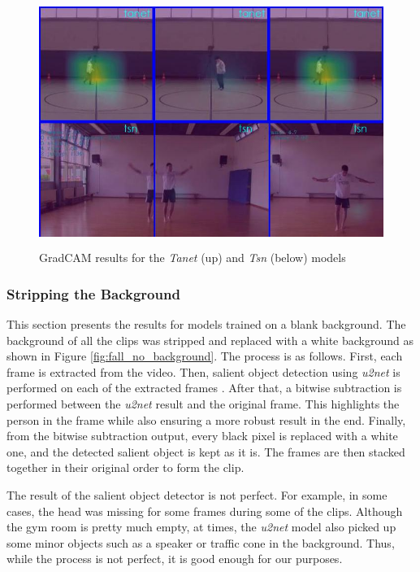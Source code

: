 \documentclass[extern,palatino]{cgMA}
\begin{document}
\begin{figure}[h]
\center
\includegraphics[height={230pt}, width={370pt}]{Thesis/images/gradcam-2D.jpg}
\caption{GradCAM results for the \textit{Tanet} (up) and \textit{Tsn} (below) models}
\label{fig:gradcam_2d}
\end{figure}

\subsubsection{Stripping the Background}
\label{research_question_5_3}

This section presents the results for models trained on a blank background. The background of all the clips was stripped and replaced with a white background as shown in Figure \ref{fig:fall_no_background}. The process is as follows. First, each frame is extracted from the video. Then, salient object detection using \textit{u2net} is performed on each of the extracted frames \cite{qin2020u2}. After that, a bitwise subtraction is performed between the \textit{u2net} result and the original frame. This highlights the person in the frame while also ensuring a more robust result in the end. Finally, from the bitwise subtraction output, every black pixel is replaced with a white one, and the detected salient object is kept as it is. The frames are then stacked together in their original order to form the clip. 

The result of the salient object detector is not perfect. For example, in some cases, the head was missing for some frames during some of the clips. Although the gym room is pretty much empty, at times, the \textit{u2net} model also picked up some minor objects such as a speaker or traffic cone in the background. Thus, while the process is not perfect, it is good enough for our purposes.
\end{document}
